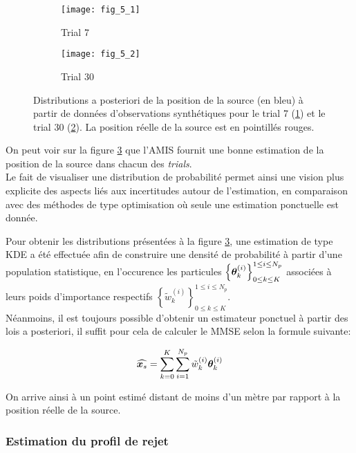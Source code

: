  \begin{figure}[h!]
 	\centering
 	\begin{subfigure}[t]{1\textwidth}
 		\centering
 		\texttt{[image: fig\_5\_1]}
 		\caption{Trial 7}
 		\label{fig_5_1_AE}
 	\end{subfigure}
 	\begin{subfigure}[t]{1\textwidth}
 		\centering
 		\texttt{[image: fig\_5\_2]}
 		\caption{Trial 30}
 		\label{fig_5_2_AE}
 	\end{subfigure}
 	\caption{Distributions a posteriori de la position de la source (en bleu) à partir de données d'observations synthétiques pour le trial 7 (\ref{fig_5_1_AE}) et le trial 30 (\ref{fig_5_2_AE}). La position réelle de la source est en pointillés rouges.}
 	\label{fig_5_AE}
 \end{figure}
 On peut voir sur la figure \ref{fig_5_AE} que l'AMIS fournit une bonne estimation de la position de la source dans chacun des \textit{trials}.\\
 
  Le fait de visualiser une distribution de probabilité permet ainsi une vision plus explicite des aspects liés aux incertitudes autour de l'estimation,  en comparaison avec des méthodes de type optimisation où seule une estimation ponctuelle est donnée.
  
  Pour obtenir les distributions présentées à la figure \ref{fig_5_AE}, une estimation de type KDE a été effectuée afin de construire une densité de probabilité à partir d'une population statistique, en l'occurence les particules $\left\{{\bm{\theta}}_k^{(i)}\right\}_{0\leq k \leq K}^{1\leq i \leq N_p}$ associées à leurs poids d'importance respectifs $\left\{\widetilde{w}_k^{(i)}\right\}_{0\leq k \leq K}^{1\leq i \leq N_p}$. \\
  
  
  Néanmoins, il est toujours possible d'obtenir un estimateur ponctuel à partir des lois a posteriori, il suffit pour cela de calculer le MMSE selon la formule suivante: 
  
  \begin{equation}
  \widehat{{\bm{x}_s}} = \sum\limits_{k=0}^K\sum\limits_{i=1}^{N_p} \tilde{w}_k^{(i)}{\bm{\theta}}_{k}^{(i)}
  \end{equation}
  
  On arrive ainsi à un point estimé distant de moins d'un mètre par rapport à la position réelle de la source. \\

  \subsubsection{Estimation du profil de rejet}
  
